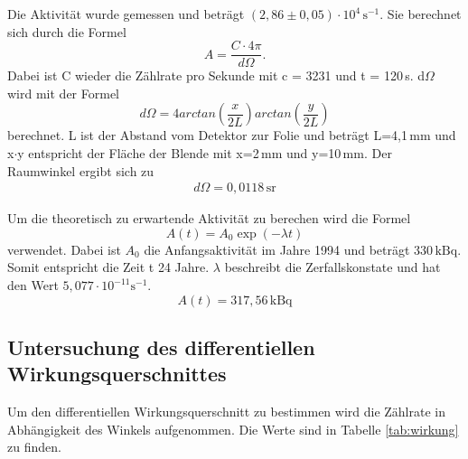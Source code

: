 Die Aktivität wurde gemessen und beträgt $(2,86 \pm 0,05)\cdot 10^{4}\,\mathrm{s^{-1}}$.
Sie berechnet sich durch die Formel
\begin{equation*}
  A = \frac{C\cdot 4\pi}{d\Omega}.
\end{equation*}
Dabei ist C wieder die Zählrate pro Sekunde mit c = 3231 und t = 120\,s.
d$\Omega$ wird mit der Formel
\begin{equation*}
  d\Omega = 4 arctan\left(\frac{x}{2L}\right) arctan\left(\frac{y}{2L}\right)
\end{equation*}
berechnet.
L ist der Abstand vom Detektor zur Folie und beträgt L=4,1\,mm und
x$\cdot$y entspricht der Fläche der Blende mit x=2\,mm und y=10\,mm.\cite{anleitung}
Der Raumwinkel ergibt sich zu
\begin{align*}
  d\Omega = 0,0118\,\mathrm{sr}
\end{align*}

Um die theoretisch zu erwartende Aktivität zu berechen wird die Formel
\begin{equation*}
  A(t) = A_0 \exp(-\lambda t)
\end{equation*}
verwendet.
Dabei ist $A_0$ die Anfangsaktivität im Jahre 1994 und beträgt $330\,\mathrm{kBq}$.\cite{anleitung}
Somit entspricht die Zeit t 24 Jahre.
$\lambda$ beschreibt die Zerfallskonstate und hat den Wert $5,077\cdot 10^{-11}\mathrm{s^{-1}} $.\cite{lambda}
\begin{equation*}
  A(t) = 317,56\,\mathrm{kBq}
\end{equation*}

\subsection{Untersuchung des differentiellen Wirkungsquerschnittes}

Um den differentiellen Wirkungsquerschnitt zu bestimmen wird die Zählrate in Abhängigkeit des Winkels aufgenommen.
Die Werte sind in Tabelle \ref{tab:wirkung} zu finden.

